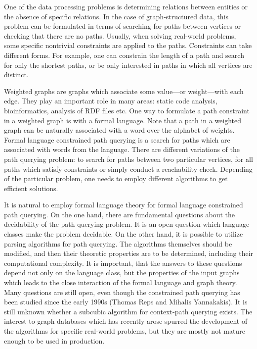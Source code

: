\documentclass[12pt]{article}  %
\theoremstyle{remark}
\begin{document}
One of the data processing problems is determining relations between entities or the absence of specific relations.
In the case of graph-structured data, this problem can be formulated in terms of searching for paths between vertices or checking that there are no paths.
Usually, when solving real-world problems, some specific nontrivial constraints are applied to the paths.
Constraints can take different forms.
For example, one can constrain the length of a path and search for only the shortest paths, or be only interested in paths in which all vertices are distinct.

Weighted graphs are graphs which associate some value---or weight---with each edge.
They play an important role in many areas: static code analysis, bioinformatics, analysis of RDF files etc.
One way to formulate a path constraint in a weighted graph  is with a formal language.
Note that a path in a weighted graph can be naturally associated with a word over the alphabet of weights.
Formal language constrained path querying is a search for paths which are associated with words from the language.
There are different variations of the path querying problem: to search for paths between two particular vertices, for all paths which satisfy constraints or simply conduct a reachability check.
Depending of the particular problem, one needs to employ different algorithms to get efficient solutions.

It is natural to employ formal language theory for formal language constrained path querying.
On the one hand, there are fundamental questions about the decidability of the path querying problem.
It is an open question which language classes make the problem decidable.
On the other hand, it is possible to utilize parsing algorithms for path querying.
The algorithms themselves should be modified, and then their theoretic properties are to be determined, including their computational complexity.
It is important, that the answers to these questions depend not only on the language class, but the properties of the input graphs which leads to the close interaction of the formal language and graph theory.
Many questions are still open, even though the constrained path querying has been studied since the early 1990s (Thomas Reps and Mihalis Yannakakis).
It is still unknown whether a subcubic algorithm for context-path querying exists.
The interest to graph databases which has recently arose spurred the development of the algorithms for specific real-world problems, but they are mostly not mature enough to be used in production.
\end{document}
